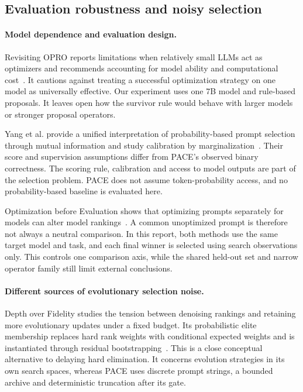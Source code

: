\subsection{Evaluation robustness and noisy selection}
\paragraph{Model dependence and evaluation design.}
Revisiting OPRO reports limitations when relatively small LLMs act as optimizers
and recommends accounting for model ability and computational
cost~\cite{opro_revisit}. It cautions against treating a successful optimization
strategy on one model as universally effective. Our experiment uses one 7B model and rule-based proposals. It leaves open how
the survivor rule would behave with larger models or stronger proposal operators.

Yang et al. provide a unified interpretation of probability-based prompt
selection through mutual information and study calibration by
marginalization~\cite{probsel}. Their score and supervision assumptions differ
from PACE's observed binary correctness. The scoring rule, calibration and access to model outputs are part of
the selection problem. PACE does not assume token-probability access, and no
probability-based baseline is evaluated here.

Optimization before Evaluation shows that optimizing prompts separately for
models can alter model rankings~\cite{evalbefore}. A common unoptimized prompt
is therefore not always a neutral comparison. In this report, both methods use
the same target model and task, and each final winner is selected using search
observations only. This controls one comparison axis, while the shared held-out
set and narrow operator family still limit external conclusions.

\paragraph{Different sources of evolutionary selection noise.}
Depth over Fidelity studies the tension between denoising rankings and retaining
more evolutionary updates under a fixed budget. Its probabilistic elite
membership replaces hard rank weights with conditional expected weights and is
instantiated through residual bootstrapping~\cite{depth}. This is a close
conceptual alternative to delaying hard elimination. It concerns evolution
strategies in its own search spaces, whereas PACE uses discrete prompt strings,
a bounded archive and deterministic truncation after its gate.

